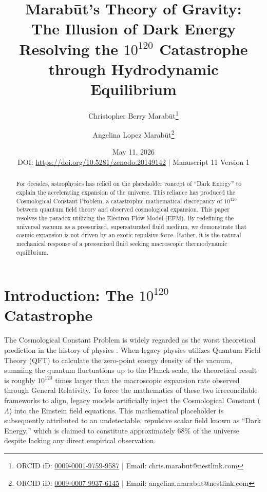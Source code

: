 \documentclass[11pt, a4paper, table]{article}
\title{\textbf{Marab\={u}t's Theory of Gravity: \\ The Illusion of Dark Energy} \\[1em] \large{Resolving the \texorpdfstring{$10^{120}$}{10E120} Catastrophe through Hydrodynamic Equilibrium}}
\author[1]{Christopher Berry Marab\={u}t\thanks{ORCID iD: \href{https://orcid.org/0009-0001-9759-9587}{0009-0001-9759-9587} | Email: chris.marabut@nestlink.com}}
\author[1]{Angelina Lopez Marab\={u}t\thanks{ORCID iD: \href{https://orcid.org/0009-0007-9937-6145}{0009-0007-9937-6145} | Email: angelina.marabut@nestlink.com}}
\affil[1]{Independent Researchers}
\date{May 11, 2026 \\[1.5em] \small{DOI: \url{https://doi.org/10.5281/zenodo.20149142} $|$ Manuscript 11 Version 1}}
\begin{document}

\maketitle

\begin{abstract}
  For decades, astrophysics has relied on the placeholder concept of ``Dark Energy'' to explain the accelerating expansion of the universe. This reliance has produced the Cosmological Constant Problem, a catastrophic mathematical discrepancy of $10^{120}$ between quantum field theory and observed cosmological expansion. This paper resolves the paradox utilizing the Electron Flow Model (EFM). By redefining the universal vacuum as a pressurized, supersaturated fluid medium, we demonstrate that cosmic expansion is not driven by an exotic repulsive force. Rather, it is the natural mechanical response of a pressurized fluid seeking macroscopic thermodynamic equilibrium.
\end{abstract}

\section{Introduction: The \texorpdfstring{$10^{120}$}{10E120} Catastrophe}
  The Cosmological Constant Problem is widely regarded as the worst theoretical prediction in the history of physics \cite{weinberg1989}. When legacy physics utilizes Quantum Field Theory (QFT) to calculate the zero-point energy density of the vacuum, summing the quantum fluctuations up to the Planck scale, the theoretical result is roughly $10^{120}$ times larger than the macroscopic expansion rate observed through General Relativity. To force the mathematics of these two irreconcilable frameworks to align, legacy models artificially inject the Cosmological Constant ($\Lambda$) into the Einstein field equations. This mathematical placeholder is subsequently attributed to an undetectable, repulsive scalar field known as ``Dark Energy,'' which is claimed to constitute approximately 68\% of the universe despite lacking any direct empirical observation.
\end{document}
